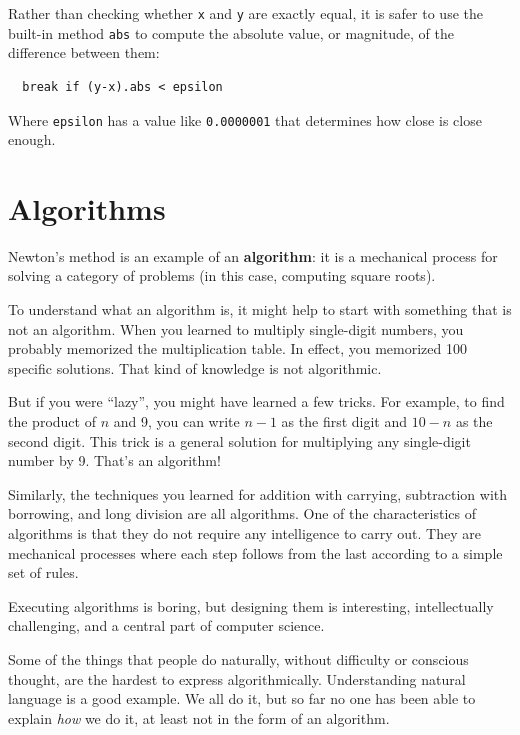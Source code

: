 \documentclass[10pt]{book}
\begin{document}
Rather than checking whether {\tt x} and {\tt y} are exactly equal, it
is safer to use the built-in method {\tt abs} to compute the
absolute value, or magnitude, of the difference between them:

\begin{verbatim}
  break if (y-x).abs < epsilon
\end{verbatim}
%
Where \verb"epsilon" has a value like {\tt 0.0000001} that
determines how close is close enough.


\section{Algorithms}

Newton's method is an example of an {\bf algorithm}: it is a
mechanical process for solving a category of problems (in this
case, computing square roots).

To understand what an algorithm is, it might help to start with
something that is not an algorithm.  When you learned to multiply
single-digit numbers, you probably memorized the multiplication table.
In effect, you memorized 100 specific solutions.  That kind of
knowledge is not algorithmic.

But if you were ``lazy'', you might have learned a few
tricks.  For example, to find the product of $n$ and 9, you can
write $n-1$ as the first digit and $10-n$ as the second
digit.  This trick is a general solution for multiplying any
single-digit number by 9.  That's an algorithm!

Similarly, the techniques you learned for addition with carrying,
subtraction with borrowing, and long division are all algorithms.  One
of the characteristics of algorithms is that they do not require any
intelligence to carry out.  They are mechanical processes where
each step follows from the last according to a simple set of rules.

Executing algorithms is boring, but designing them is interesting,
intellectually challenging, and a central part of computer science.

Some of the things that people do naturally, without difficulty or
conscious thought, are the hardest to express algorithmically.
Understanding natural language is a good example.  We all do it, but
so far no one has been able to explain {\em how} we do it, at least
not in the form of an algorithm.
\end{document}
